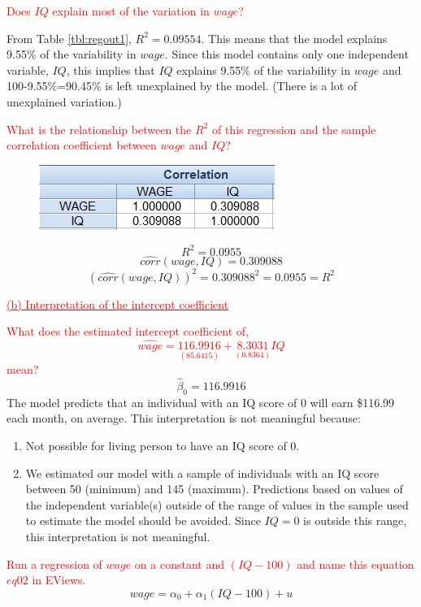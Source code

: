 \documentclass[12pt]{report}
\begin{document}
\noindent \textcolor{red}{Does $IQ$ explain most of the variation in $wage$?}

\noindent From Table \ref{tbl:regout1}, $R^2 = 0.09554$. This means that the model explains 9.55\% of the variability in $wage$. Since this model contains only one independent variable, $IQ$, this implies that $IQ$ explains 9.55\% of the variability in $wage$ and 100-9.55\%=90.45\% is left unexplained by the model. (There is a lot of unexplained variation.)

\noindent \textcolor{red}{What is the relationship between the $R^2$ of this regression and the sample correlation coefficient between $wage$ and $IQ$?}
\begin{figure}[H]
	\centering
	\includegraphics{q3_32}
\end{figure}
\vspace{-\baselineskip} 
$$R^2 = 0.0955$$
$$\widehat{corr}(wage,IQ) = 0.309088$$
$$(\widehat{corr}(wage,IQ))^2 = 0.309088^2 = 0.0955 = R^2$$

\noindent \textcolor{red}{\underline{(b) Interpretation of the intercept coefficient}}

\noindent \textcolor{red}{What does the estimated intercept coefficient of,
$$\widehat{wage} = \underset{(85.6415)}{116.9916} + \underset{(0.8364)}{8.3031}IQ$$ mean?}
$$\hat{\beta}_0 = 116.9916$$
\noindent 	The model predicts that an individual with an IQ score of 0 will earn \$116.99 each month, on average. This interpretation is not meaningful because:
\begin{enumerate}
	\item Not possible for living person to have an IQ score of 0.
	\item We estimated our model with a sample of individuals with an IQ score between 50 (minimum) and 145 (maximum). Predictions based on values of the independent variable(s) outside of the range of values in the sample used to estimate the model should be avoided. Since $IQ = 0$ is outside this range, this interpretation is not meaningful.
\end{enumerate}
\noindent \textcolor{red}{Run a regression of $wage$ on a constant and $(IQ-100)$ and name this equation $eq02$ in EViews.}
$$wage = \alpha_0 + \alpha_1(IQ-100) + u$$
\end{document}
